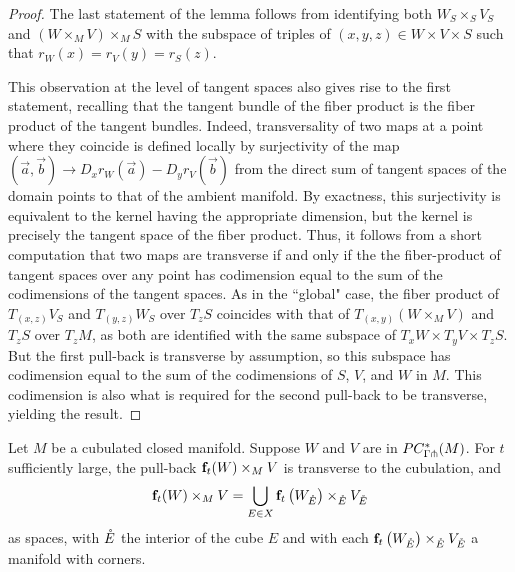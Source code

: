 \begin{proof}
	The last statement of the lemma follows from identifying both $W_S \times_S V_S$ and $ (W \times_M V) \times_M S$ with
	the subspace of triples of $(x,y,z) \in W \times V \times S$ such that $r_W(x) = r_V(y) = r_S(z)$.

	This observation at the level of tangent spaces	also gives rise to the first statement, recalling that the tangent bundle of the fiber product is the fiber product of the tangent bundles.
	Indeed, transversality of two maps at a point where they coincide is defined locally by surjectivity of the map $(\vec a,\vec b)\to D_xr_W(\vec a)-D_yr_V(\vec b)$ from the direct sum of tangent spaces of the domain points to that of the ambient manifold.
	By exactness, this surjectivity is equivalent to the kernel having the appropriate dimension, but the kernel is precisely the tangent space of the	fiber product.
	Thus, it follows from a short computation that two maps are transverse if and only if the the fiber-product of tangent spaces over any point has codimension equal to the sum of the codimensions of the tangent spaces.
	As in the ``global" case, the fiber product of $T_{(x,z)} V_S$ and $T_{(y,z)} W_S$ over $T_zS$ coincides with that of $T_{(x,y)} (W \times_M V)$ and $T_z S$ over $T_z M$, as both are identified with the same subspace of $T_x W \times T_y V \times T_z S$.
	But the first pull-back is transverse by assumption, so this subspace has codimension equal to the sum of the codimensions of $S$, $V$, and $W$ in $M$.
	This codimension is also what is required for the second pull-back to be transverse, yielding the result.
\end{proof}

\begin{proposition}\label{P:locality}
	Let $M$ be a cubulated closed manifold.
	Suppose $W$ and $V$ are in $PC_{\Gamma \pitchfork}^*(M)$.
	For $t$ sufficiently large, the pull-back $\mathbf{f}_t(W) \times_M V$ is transverse to the cubulation, and
	\begin{equation*}
		\mathbf{f}_t(W) \times_M V = \bigcup_{E \in X} {\mathbf{f}_t\left(W_{\mathring{E}}\right)} \times_{\mathring{E}} V_{\mathring{E}}
	\end{equation*}
	as spaces, with $\mathring{E}$ the interior of the cube $E$ and with each ${\mathbf{f}_t\left(W_{\mathring{E}}\right)} \times_{\mathring{E}} V_{\mathring{E}}$ a manifold with corners.
\end{proposition}

